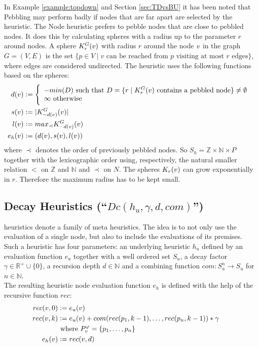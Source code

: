 In Example \ref{example:topdown} and Section \ref{sec:TDvsBU} it has been noted that  Pebbling may perform badly if nodes that are far apart are selected by the heuristic.
The Node  heuristic prefers to pebble nodes that are close to pebbled nodes. It does this by calculating spheres with a radius up to the parameter $r$ around nodes.
A sphere $K_r^{G}(v)$ with radius $r$ around the node $v$ in the graph $G = (V,E)$ is the set $\{p \in V \mid v \text{ can be reached from } p \text{ visiting at most } r \text{ edges}\}$, where edges are considered undirected. 
The heuristic uses the following functions based on the spheres:
\begin{align*}
	d(v) &\mathrel{\mathop:}= \Bigg\{
	\begin{array}{l}
		-min(D) \text{ such that } D = \{r \mid K_r^{G}(v)\text{ contains a pebbled node}\} \neq \emptyset\\
		\infty \text{ otherwise}
		\end{array}\\
	s(v) &\mathrel{\mathop:}= |K_{-d(v)}^G(v)|\\
	l(v) &\mathrel{\mathop:}= max_{\prec}K_{-d(v)}^G(v)\\
	e_h(v) &\mathrel{\mathop:}= (d(v),s(v),l(v))
\end{align*}
where $\prec$ denotes the order of previously pebbled nodes.
So $S_h = \mathbb{Z} \times \mathbb{N} \times P$ together with the lexicographic order using, respectively, the natural smaller relation $<$ on $\mathbb{Z}$ and $\mathbb{N}$ and $\prec$ on $N$. The spheres $K_r(v)$ can grow exponentially in $r$. Therefore the maximum radius has to be kept small.

\subsection{Decay Heuristics (``$Dc(h_u,\gamma,d,com)$'') }
\label{sec:decay}
 heuristics denote a family of meta heuristics. 
The idea is to not only use the evaluation of a single node, but also to include the evaluations of its premises.
Such a heuristic has four parameters: an underlying heuristic $h_u$ defined by an evaluation function $e_u$ together with a well ordered set $S_u$, a decay factor $\gamma \in \mathbb{R}^+ \cup \{0\}$, a recursion depth $d \in \mathbb{N}$ and a combining function $com: S_u^n \rightarrow S_u$ for $n \in \mathbb{N}$.\\
The resulting heuristic node evaluation function $e_h$ is defined with the help of the recursive function $rec$:
\begin{align*}
	rec(v,0) &\mathrel{\mathop:}= e_u(v) \\
	rec(v,k) &\mathrel{\mathop:}= e_u(v) + com(rec(p_1,k-1),\ldots,rec(p_n,k-1)) * \gamma\\
	& \text{ where } P_{v}^{\varphi} = \{p_1,\ldots,p_n\}\\
	e_h(v) &\mathrel{\mathop:}= rec(v,d) &
\end{align*}

